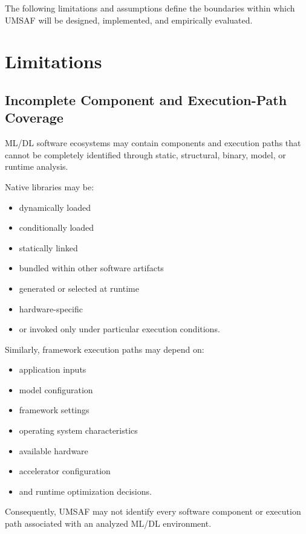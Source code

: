 \documentclass[
  12pt,
  letterpaper,
  oneside]{report}
\providecommand{\tightlist}{%
  \setlength{\itemsep}{0pt}\setlength{\parskip}{0pt}}
\begin{document}
The following limitations and assumptions define the boundaries within
which UMSAF will be designed, implemented, and empirically evaluated.

\section{Limitations}\label{131-limitations}

\subsection{Incomplete Component and Execution-Path Coverage}\label{1311-incomplete-component-and-execution-path-coverage}

ML/DL software ecosystems may contain components and execution paths
that cannot be completely identified through static, structural, binary,
model, or runtime analysis.

Native libraries may be:

\begin{itemize}
\tightlist
\item
  dynamically loaded
\item
  conditionally loaded
\item
  statically linked
\item
  bundled within other software artifacts
\item
  generated or selected at runtime
\item
  hardware-specific
\item
  or invoked only under particular execution conditions.
\end{itemize}

Similarly, framework execution paths may depend on:

\begin{itemize}
\tightlist
\item
  application inputs
\item
  model configuration
\item
  framework settings
\item
  operating system characteristics
\item
  available hardware
\item
  accelerator configuration
\item
  and runtime optimization decisions.
\end{itemize}

Consequently, UMSAF may not identify every software component or
execution path associated with an analyzed ML/DL environment.
\end{document}
